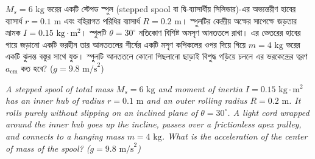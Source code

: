 \documentclass[12pt, a4paper]{article}
\begin{document}
\begin{tcolorbox}[questionbox={প্রশ্ন (Question) 4}]
    \noindent
    $M_s = 6\text{ kg}$ ভরের একটি স্টেপড স্পুল (stepped spool বা দ্বি-ব্যাসার্ধীয় সিলিন্ডার)-এর অভ্যন্তরীণ হাবের ব্যাসার্ধ $r = 0.1\text{ m}$ এবং বহিরাগত পরিধির ব্যাসার্ধ $R = 0.2\text{ m}$। স্পুলটির কেন্দ্রীয় অক্ষের সাপেক্ষে জড়তার ভ্রামক $I = 0.15\text{ kg}\cdot\text{m}^2$। স্পুলটি $\theta = 30^\circ$ নতিকোণ বিশিষ্ট অমসৃণ আনততলে রাখা। এর ভেতরের হাবের গায়ে জড়ানো একটি ভরহীন তার আনততলের শীর্ষের একটি মসৃণ কপিকলের ওপর দিয়ে গিয়ে $m = 4\text{ kg}$ ভরের একটি ঝুলন্ত বস্তুর সাথে যুক্ত। স্পুলটি আনততলে কোনো পিছলানো ছাড়াই বিশুদ্ধ গড়িয়ে চললে এর ভরকেন্দ্রের ত্বরণ $a_{\text{cm}}$ কত হবে? ($g = 9.8\text{ m/s}^2$)
    
    \vspace{0.8em}
    \begin{english}
    \noindent\textit{\color{darkgray}
    A stepped spool of total mass $M_s = 6\text{ kg}$ and moment of inertia $I = 0.15\text{ kg}\cdot\text{m}^2$ has an inner hub of radius $r = 0.1\text{ m}$ and an outer rolling radius $R = 0.2\text{ m}$. It rolls purely without slipping on an inclined plane of $\theta = 30^\circ$. A light cord wrapped around the inner hub goes up the incline, passes over a frictionless apex pulley, and connects to a hanging mass $m = 4\text{ kg}$. What is the acceleration of the center of mass of the spool? ($g = 9.8\text{ m/s}^2$)
    }
    \end{english}
\end{tcolorbox}
\end{document}

